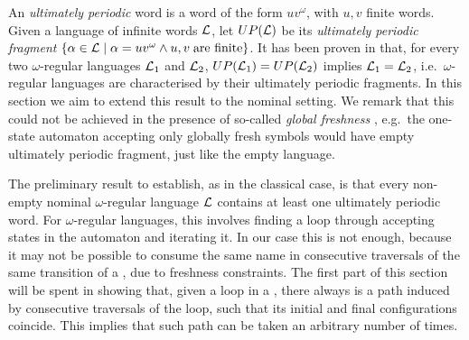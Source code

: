 %
%
%
An \emph{ultimately periodic} word is a word of the form $uv^\omega$, with $u,v$ finite words. Given a language of infinite words $\mathcal{L}$, let $UP(\mathcal{L})$ be its \emph{ultimately periodic fragment} $\{ \alpha \in \mathcal{L} \mid \alpha = uv^\omega \land u,v \; \text{are finite} \}$. It has been proven in \cite{CalbrixNP93} that, for every two $\omega$-regular languages $\mathcal{L}_1$ and $\mathcal{L}_2$, $UP(\mathcal{L}_1) = UP(\mathcal{L}_2)$ implies $\mathcal{L}_1 = \mathcal{L}_2$, i.e.\ $\omega$-regular languages are characterised by their ultimately periodic fragments.
In this section we aim to extend this result to the nominal setting. We remark that this could not be achieved in the presence of so-called \emph{global freshness} \cite{Tze11}, e.g.\ the one-state automaton accepting only globally fresh symbols would have empty ultimately periodic fragment, just like the empty language.

The preliminary result to establish, as in the classical case, is that every non-empty nominal $\omega$-regular language $\mathcal{L}$ contains at least one ultimately periodic word. For $\omega$-regular languages, this involves finding a loop through accepting states in the automaton and iterating it. In our case this is not enough, because it may not be possible to consume the same name in consecutive traversals of the same transition of a \hdma, due to freshness constraints. The first part of this section will be spent in showing that, given a loop in a \hdma{}, there always is a path induced by consecutive traversals of the loop, such that its initial and final configurations coincide. This implies that such path can be taken an arbitrary number of times.

